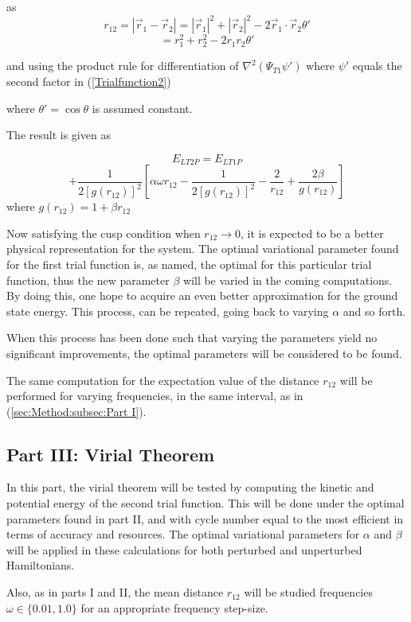 \documentclass[aip,nobalancelastpage,
twocolumn,
rsi,%
 amsmath,amssymb,
 reprint,%
]{revtex4}
\begin{document}
as
\begin{equation}
r_{12} = \left|\vec{r}_1-\vec{r}_2\right| = |\vec{r}_1|^2 + |\vec{r}_2|^2 - 2\vec{r}_1 \cdot \vec{r}_2 \theta'
\end{equation}
\begin{equation}
= r_1^2 + r_2^2 -2r_1r_2 \theta'
\end{equation}

and using the product rule for differentiation of $\nabla^2 \left(\Psi_{T1} \psi'\right)$ where $\psi'$ equals the second factor in (\ref{Trialfunction2})

where $\theta'=\cos\theta$ is assumed constant.\par

The result is given as

\begin{equation*}
E_{LT2P} = E_{LT1P} 
\end{equation*}
\small
\begin{equation}
+ \frac{1}{2\left[g(r_{12})\right]^2}\left[\alpha \omega r_{12} -\frac{1}{2\left[g(r_{12})\right]^2} - \frac{2}{r_{12}}+\frac{2\beta}{g(r_{12})}\right]
\end{equation}
\normalsize
where $g(r_{12}) = 1+\beta r_{12}$

Now satisfying the cusp condition when $r_{12}\to 0$, it is expected to be a better physical representation for the system. The optimal variational parameter found for the first trial function is, as named, the optimal for this particular trial function, thus the new parameter $\beta$ will be varied in the coming computations. By doing this, one hope to acquire an even better approximation for the ground state energy. This process, can be repeated, going back to varying $\alpha$ and so forth.\par
When this process has been done such that varying the parameters yield no significant improvements, the optimal parameters will be considered to be found. \par
The same computation for the expectation value of the distance $r_{12}$ will be performed for varying frequencies, in the same interval, as in (\ref{sec:Method:subsec:Part I}).

\subsection{Part III: Virial Theorem}
In this part, the virial theorem will be tested by computing the kinetic and potential energy of the second trial function.  This will be done under the optimal parameters found in part II, and with cycle number equal to the most efficient in terms of accuracy and resources. The optimal variational parameters for $\alpha$ and $\beta$ will be applied in these calculations for both perturbed and unperturbed Hamiltonians.  \par
Also, as in parts I and II, the mean distance $r_{12}$ will be studied frequencies $\omega\in\{0.01,1.0\}$ for an appropriate frequency step-size. 
\end{document}
